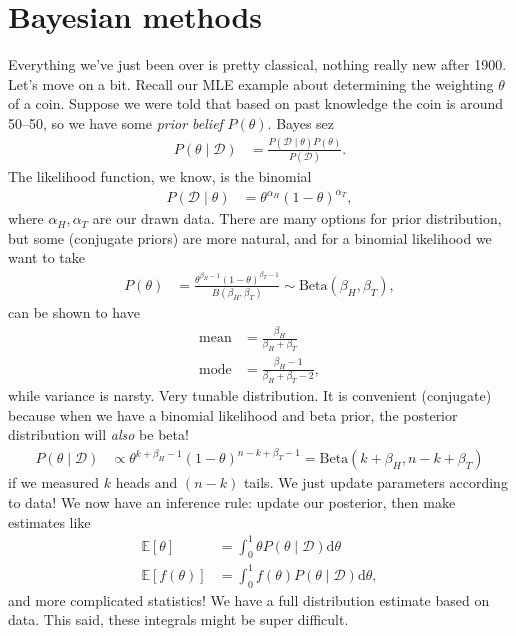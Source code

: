 \documentclass[11pt,letterpaper]{article}
\renewcommand{\d}{\mathrm{d}}
\theoremstyle{definition}
\numberwithin{equation}{section}
\numberwithin{figure}{section}
\begin{document}
\section{Bayesian methods}
Everything we've just been over is pretty classical, nothing really new after 1900. Let's move on a bit. Recall our MLE example about determining the weighting $\theta$ of a coin. Suppose we were told that based on past knowledge the coin is around 50--50, so we have some \emph{prior belief} $P(\theta)$. Bayes sez
%
\begin{align}
	P(\theta \mid \mathcal{D}) &= \frac{P(\mathcal{D}\mid \theta) P(\theta)}{P(\mathcal{D})}.
\end{align}
%
The likelihood function, we know, is the binomial
%
\begin{align}
	P(\mathcal{D} \mid \theta) &= \theta^{\alpha_H} (1- \theta)^{\alpha_T},
\end{align}
%
where $\alpha_H, \alpha_T$ are our drawn data. There are many options for prior distribution, but some (conjugate priors) are more natural, and for a binomial likelihood we want to take
%
\begin{align}
	P(\theta) &= \frac{\theta^{\beta_H - 1} (1-\theta)^{\beta_T-1}}{B(\beta_H,\beta_T)} \sim \mathrm{Beta}(\beta_H,\beta_T),
\end{align}
%
can be shown to have
%
\begin{align}
	\mathrm{mean} &= \frac{\beta_H}{\beta_H + \beta_T}\\
	\mathrm{mode} &= \frac{\beta_H - 1}{\beta_H + \beta_T - 2},
\end{align}
%
while variance is narsty. Very tunable distribution. It is convenient (conjugate) because when we have a binomial likelihood and beta prior, the posterior distribution will \emph{also} be beta! 
%
\begin{align}
	P(\theta\mid \mathcal{D}) &\propto \theta^{k+\beta_H-1} (1-\theta)^{n-k+\beta_T-1} = \mathrm{Beta}(k+\beta_H, n-k+\beta_T)
\end{align}
%
if we measured $k$ heads and $(n-k)$ tails. We just update parameters according to data! We now have an inference rule: update our posterior, then make estimates like
%
\begin{align}
	\mathbb{E}[\theta] &= \int_0^1 \theta P(\theta\mid\mathcal{D}) \d \theta\\
	\mathbb{E}[f(\theta)] &= \int_0^1 f(\theta) P(\theta\mid\mathcal{D}) \d \theta,
\end{align}
%
and more complicated statistics! We have a full distribution estimate based on data. This said, these integrals might be super difficult.
\end{document}
